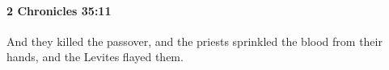 
		\paragraph{2 Chronicles 35:11} %
			\label{2CHRONICLES-35-11}

			And they killed the passover, and the priests sprinkled the blood from their hands, and the Levites flayed them.


